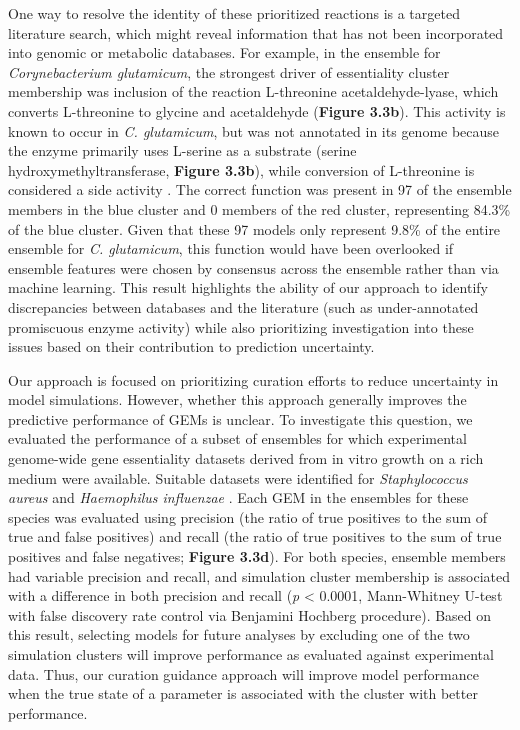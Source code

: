 \documentclass[11pt,twocolumn,notitlepage,openany,twoside]{book}
\begin{document}
\begin{refsection}
One way to resolve the identity of these prioritized reactions is a targeted literature search, which might reveal information that has not been incorporated into genomic or metabolic databases. For example, in the ensemble for \textit{Corynebacterium glutamicum}, the strongest driver of essentiality cluster membership was inclusion of the reaction L-threonine acetaldehyde-lyase, which converts L-threonine to glycine and acetaldehyde (\textbf{Figure 3.3b}). This activity is known to occur in \textit{C. glutamicum}, but was not annotated in its genome because the enzyme primarily uses L-serine as a substrate (serine hydroxymethyltransferase, \textbf{Figure 3.3b}), while conversion of L-threonine is considered a side activity \cite{Dong2011-wt,Simic2002-ia}. The correct function was present in 97 of the ensemble members in the blue cluster and 0 members of the red cluster, representing 84.3\% of the blue cluster. Given that these 97 models only represent 9.8\% of the entire ensemble for \textit{C. glutamicum}, this function would have been overlooked if ensemble features were chosen by consensus across the ensemble rather than via machine learning. This result highlights the ability of our approach to identify discrepancies between databases and the literature (such as under-annotated promiscuous enzyme activity) while also prioritizing investigation into these issues based on their contribution to prediction uncertainty.

Our approach is focused on prioritizing curation efforts to reduce uncertainty in model simulations. However, whether this approach generally improves the predictive performance of GEMs is unclear. To investigate this question, we evaluated the performance of a subset of ensembles for which experimental genome-wide gene essentiality datasets derived from in vitro growth on a rich medium were available. Suitable datasets were identified for \textit{Staphylococcus aureus} \cite{Chaudhuri2009-za} and \textit{Haemophilus influenzae} \cite{Akerley2002-ja}. Each GEM in the ensembles for these species was evaluated using precision (the ratio of true positives to the sum of true and false positives) and recall (the ratio of true positives to the sum of true positives and false negatives; \textbf{Figure 3.3d}). For both species, ensemble members had variable precision and recall, and simulation cluster membership is associated with a difference in both precision and recall (\textit{p} < 0.0001, Mann-Whitney U-test with false discovery rate control via Benjamini Hochberg procedure). Based on this result, selecting models for future analyses by excluding one of the two simulation clusters will improve performance as evaluated against experimental data. Thus, our curation guidance approach will improve model performance when the true state of a parameter is associated with the cluster with better performance.


\end{refsection}
\end{document}
